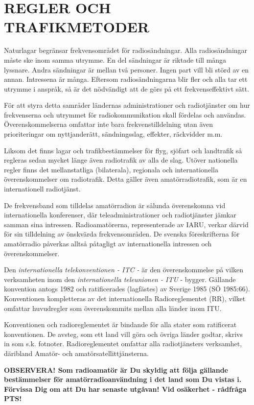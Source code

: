 \part{REGLER OCH TRAFIKMETODER}

Naturlagar begränsar frekvensområdet för radiosändningar. Alla
radiosändningar måste ske inom samma utrymme. En del sändningar är
riktade till många lyssnare. Andra sändningar är mellan två
personer. Ingen part vill bli störd av en annan. Intressena är
många. Eftersom radiosändningarna blir fler och alla tar ett utrymme i
anspråk, så är det nödvändigt att de görs på ett frekvenseffektivt
sätt.

För att styra detta samråder ländernas administrationer och
radiotjänster om hur frekvenserna och utrymmet för radiokommunikation
skall fördelas och användas.  Överenskommelserna omfattar inte bara
frekvenstilldelning utan även prioriteringar om nyttjanderätt,
sändningsslag, effekter, räckvidder m.m.

Liksom det finns lagar och trafikbestämmelser för flyg, sjöfart och
landtrafik så regleras sedan mycket länge även radiotrafik av alla de
slag. Utöver nationella regler finns det mellanstatliga (bilaterala),
regionala och internationella överenskommelser om radiotrafik. Detta
gäller även amatörradiotrafik, som är en internationell radiotjänst.

De frekvensband som tilldelas amatörradion är sålunda överenskomna vid
internationella konferenser, där teleadministrationer och
radiotjänster jämkar samman sina intressen. Radioamatörerna,
representerade av IARU, verkar därvid för sin tilldelning av önskvärda
frekvensområden. De svenska föreskrifterna för amatörradio påverkas
alltså påtagligt av internationella intressen och överenskommelser.

Den \emph{internationella telekonventionen - ITC -} är den
överenskommelse på vilken verksamheten inom den \emph{internationella
  teleunionen - ITU} - bygger. Gällande konvention antogs 1982 och
ratificerades (lagfästes) av Sverige 1985 (SÖ 1985:66). Konventionen
kompletteras av det internationella Radioreglementet (RR), vilket
omfattar huvudregler som överenskommits mellan alla länder inom ITU.


Konventionen och radioreglementet är bindande för alla stater som
ratificerat konventionen. De avsteg, som ett land vill göra och övriga
länder godtar, skrivs in som s.k. fotnoter. Radioreglementet omfattar
alla radiotjänsters verksamhet, däribland Amatör- och
amatörsatellittjänsterna.

\textbf{ OBSERVERA!  Som radioamatör är Du skyldig att följa gällande
  bestämmelser för amatörradioanvändning i det land som Du vistas i.
  Förvissa Dig om att Du har senaste utgåvan!  Vid osäkerhet -
  rådfråga PTS!}
